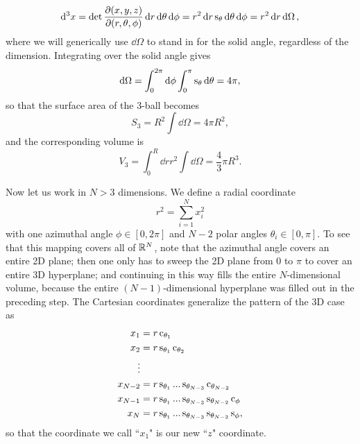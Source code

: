 \begin{equation}
  \dd[3]{x}=\det\pdv{(x,y,z)}{(r,\theta,\phi)}
             \dd{r}\dd{\theta}\dd{\phi}
      =r^2\dd{r}\operatorname{s}_\theta\dd{\theta}\dd{\phi}=r^2\dd{r}\dd{\Omega},
\end{equation}
where we will generically use $\dd\Omega$ to stand in for the solid angle,
regardless of the dimension. Integrating over the solid angle gives
\begin{equation}
  \dd{\Omega}=\int_0^{2\pi}\dd{\phi}\int_0^{\pi}\operatorname{s}_\theta\dd{\theta}=4\pi,
\end{equation}
so that the surface area of the 3-ball becomes
\begin{equation}\label{eq:3ds}
  S_3=R^2\int\dd{\Omega}=4\pi R^2,
\end{equation}
and the corresponding volume is
\begin{equation}\label{eq:3dv}
  V_3=\int_0^R\dd{r}r^2\int\dd{\Omega}=\frac{4}{3}\pi R^3.
\end{equation}

Now let us work in $N>3$ dimensions. We define a radial coordinate
\begin{equation}
  r^2=\sum_{i=1}^N x_i^2
\end{equation}
with one azimuthal angle $\phi\in[0,2\pi]$ and $N-2$ polar angles 
$\theta_i\in[0,\pi]$. To see that this mapping covers all of $\mathbb{R}^N$,
note that the azimuthal angle covers an entire 2D plane; then one
only has to sweep the 2D plane from 0 to $\pi$ to cover an entire
3D hyperplane; and continuing in this way fills the entire $N$-dimensional 
volume, because the entire $(N-1)$-dimensional hyperplane was filled out in 
the preceding step. The Cartesian coordinates generalize the pattern
of the 3D case as 
\begin{equation}\label{eq:cartesianN}
  \begin{aligned}
        x_1&=r\operatorname{c}_{\theta_1}\\
        x_2&=r\operatorname{s}_{\theta_1}\operatorname{c}_{\theta_2}\\
     \vdots&\\
    x_{N-2}&=r\operatorname{s}_{\theta_1}...\operatorname{s}_{\theta_{N-3}}\operatorname{c}_{\theta_{N-2}}\\
    x_{N-1}&=r\operatorname{s}_{\theta_1}...\operatorname{s}_{\theta_{N-3}}\operatorname{s}_{\theta_{N-2}}\operatorname{c}_\phi\\
        x_N&=r\operatorname{s}_{\theta_1}...\operatorname{s}_{\theta_{N-3}}\operatorname{s}_{\theta_{N-2}}\operatorname{s}_\phi,
  \end{aligned}
\end{equation}
so that the coordinate we call ``$x_1$" is our new ``$z$" coordinate.

